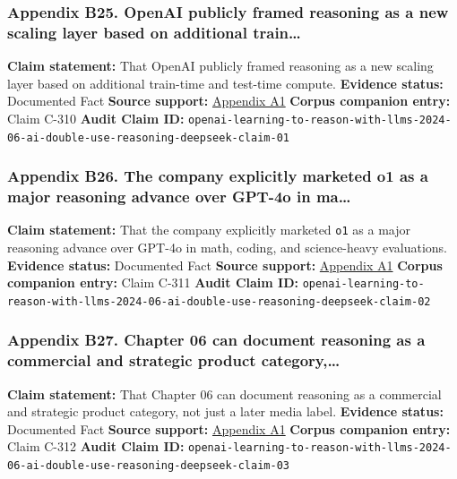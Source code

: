 \documentclass[
  american,
  11pt,
  letterpaper,
]{article}
\begin{document}
\subsubsection{Appendix B25. OpenAI publicly framed reasoning as a new
scaling layer based on additional
train\ldots{}}\label{ch-06-appendix-b25-openai-publicly-framed-reasoning-as-a-new-scaling-layer-based-on-additional-train}

\textbf{Claim statement:} That OpenAI publicly framed reasoning as a new
scaling layer based on additional train-time and test-time compute.
\textbf{Evidence status:} Documented Fact \textbf{Source support:}
\hyperref[ch-06-appendix-a1-learning-to-reason-with-llms]{Appendix A1}
\textbf{Corpus companion entry:} Claim C-310 \textbf{Audit Claim ID:}
\texttt{openai-learning-to-reason-with-llms-2024-06-ai-double-use-reasoning-deepseek-claim-01}

\subsubsection{Appendix B26. The company explicitly marketed o1 as a
major reasoning advance over GPT-4o in
ma\ldots{}}\label{ch-06-appendix-b26-the-company-explicitly-marketed-o1-as-a-major-reasoning-advance-over-gpt-4o-in-ma}

\textbf{Claim statement:} That the company explicitly marketed
\texttt{o1} as a major reasoning advance over GPT-4o in math, coding,
and science-heavy evaluations. \textbf{Evidence status:} Documented Fact
\textbf{Source support:}
\hyperref[ch-06-appendix-a1-learning-to-reason-with-llms]{Appendix A1}
\textbf{Corpus companion entry:} Claim C-311 \textbf{Audit Claim ID:}
\texttt{openai-learning-to-reason-with-llms-2024-06-ai-double-use-reasoning-deepseek-claim-02}

\subsubsection{Appendix B27. Chapter 06 can document reasoning as a
commercial and strategic product
category,\ldots{}}\label{ch-06-appendix-b27-chapter-06-can-document-reasoning-as-a-commercial-and-strategic-product-category}

\textbf{Claim statement:} That Chapter 06 can document reasoning as a
commercial and strategic product category, not just a later media label.
\textbf{Evidence status:} Documented Fact \textbf{Source support:}
\hyperref[ch-06-appendix-a1-learning-to-reason-with-llms]{Appendix A1}
\textbf{Corpus companion entry:} Claim C-312 \textbf{Audit Claim ID:}
\texttt{openai-learning-to-reason-with-llms-2024-06-ai-double-use-reasoning-deepseek-claim-03}
\end{document}
